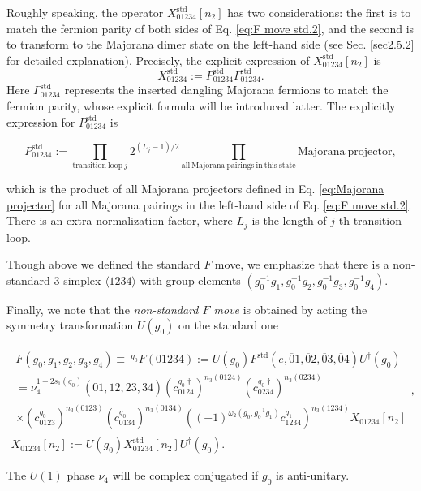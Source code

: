 \documentclass[%
 reprint,
 amsmath,amssymb,
 aps,
prb,
]{revtex4-2}
\begin{document}
Roughly speaking, the operator $X_{01234}^{\mathrm{std}}[ n_{2}]$ has two considerations: the first is to match the fermion parity of both sides of Eq. \eqref{eq:F move std.2}, and the second is to transform to the Majorana dimer state on the left-hand side (see Sec. \ref{sec2.5.2} for detailed explanation).
Precisely, the explicit expression of $X_{01234}^{\mathrm{std}}[ n_{2}]$ is 
\begin{equation}
X_{01234}^{\mathrm{std}} := P_{01234}^{\mathrm{std}} \Gamma_{01234}^{\mathrm{std}} .\label{eq:F move std.3}
\end{equation}
Here $\Gamma_{01234}^{\mathrm{std}}$ represents the inserted dangling Majorana fermions to match the fermion parity, whose explicit formula will be introduced latter.
The explicitly expression for $P_{01234}^{\mathrm{std}}$ is 
\begin{widetext}
\begin{equation}
P_{01234}^{\mathrm{std}} := \prod_{\mathrm{transition \ loop} \ j} 2^{(L_j - 1)/2} \prod _{\mathrm{all \ Majorana \ pairings \ in \ this \ state}} \mathrm{Majorana \ projector} ,\label{eq:F move std.4}
\end{equation}
\end{widetext}
which is the product of all Majorana projectors defined in Eq. \eqref{eq:Majorana projector} for all Majorana pairings in the left-hand side of Eq. \eqref{eq:F move std.2}. There is an extra normalization factor, where $L_j$ is the length of $j$-th transition loop.

Though above we defined the standard $F$ move, we emphasize that there is a non-standard 3-simplex $\langle 1234 \rangle$ with group elements $(g^{-1}_0 g_1, g^{-1}_0 g_2, g^{-1}_0 g_3, g^{-1}_0 g_4)$.

Finally, we note that the \textit{non-standard $F$ move} is obtained by acting the symmetry transformation $U(g_0)$ on the standard one 
\begin{widetext}
\begin{gather}
\begin{array}{ l }
F( g_{0} ,g_{1} ,g_{2} ,g_{3} ,g_{4}) \equiv \ ^{g_{0}} F( 01234) :=U( g_{0}) F^{\mathrm{std}}( e,\overline{0} 1,\overline{0} 2,\overline{0} 3,\overline{0} 4) U^{\dagger }( g_{0})\\
=\nu _{4}^{1-2s_{1}( g_{0})}(\overline{0} 1,\overline{1} 2,\overline{2} 3,\overline{3} 4)\left( c_{0124}^{g_{0} \dagger }\right)^{n_{3}( 0124)}\left( c_{0234}^{g_{0} \dagger }\right)^{n_{3}( 0234)}\\
\times \left( c_{0123}^{g_{0}}\right)^{n_{3}( 0123)}\left( c_{0134}^{g_{0}}\right)^{n_{3}( 0134)}\left(( -1)^{\omega _{2}\left( g_{0} ,g_{0}^{-1} g_{1}\right)} c_{1234}^{g_{1}}\right)^{n_{3}( 1234)} X_{01234}[ n_{2}]
\end{array} , \\
X_{01234}[ n_{2}] :=U( g_{0}) X_{01234}^{\mathrm{std}}[ n_{2}] U^{\dagger }( g_{0}) .
\end{gather}
\end{widetext}
The $U(1)$ phase $\nu_4$ will be complex conjugated if $g_0$ is anti-unitary.
\end{document}
